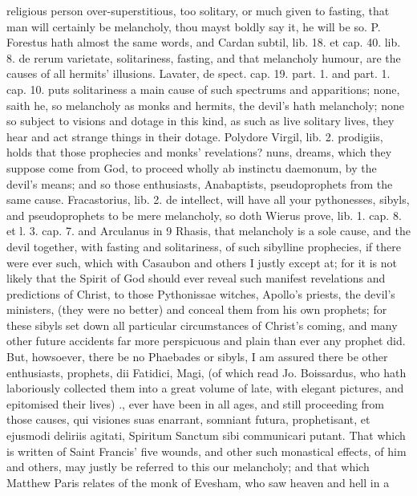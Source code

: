 {religious person over-superstitious, too solitary, or much given to
fasting, that man will certainly be melancholy, thou mayst boldly say
it, he will be so. P. Forestus hath almost the same words, and
Cardan subtil, lib. 18. et cap. 40. lib. 8. de rerum varietate,
solitariness, fasting, and that melancholy humour, are the causes of
all hermits' illusions. Lavater, de spect. cap. 19. part. 1. and part.
1. cap. 10. puts solitariness a main cause of such spectrums and
apparitions; none, saith he, so melancholy as monks and hermits, the
devil's hath melancholy; none so subject to visions and dotage in
this kind, as such as live solitary lives, they hear and act strange
things in their dotage. Polydore Virgil, lib. 2. prodigiis, holds
that those prophecies and monks' revelations? nuns, dreams, which they
suppose come from God, to proceed wholly ab instinctu daemonum, by the
devil's means; and so those enthusiasts, Anabaptists, pseudoprophets
from the same cause. Fracastorius, lib. 2. de intellect, will
have all your pythonesses, sibyls, and pseudoprophets to be mere
melancholy, so doth Wierus prove, lib. 1. cap. 8. et l. 3. cap. 7. and
Arculanus in 9 Rhasis, that melancholy is a sole cause, and the devil
together, with fasting and solitariness, of such sibylline prophecies,
if there were ever such, which with Casaubon and others I justly
except at; for it is not likely that the Spirit of God should ever
reveal such manifest revelations and predictions of Christ, to those
Pythonissae witches, Apollo's priests, the devil's ministers, (they
were no better) and conceal them from his own prophets; for these
sibyls set down all particular circumstances of Christ's coming, and
many other future accidents far more perspicuous and plain than ever
any prophet did. But, howsoever, there be no Phaebades or sibyls, I am
assured there be other enthusiasts, prophets, dii Fatidici, Magi, (of
which read Jo. Boissardus, who hath laboriously collected them into a
great volume of late, with elegant pictures, and epitomised their
lives) \etc{}., ever have been in all ages, and still proceeding from those
causes, qui visiones suas enarrant, somniant futura,
prophetisant, et ejusmodi deliriis agitati, Spiritum Sanctum sibi
communicari putant. That which is written of Saint Francis' five
wounds, and other such monastical effects, of him and others, may
justly be referred to this our melancholy; and that which Matthew Paris
relates of the monk of Evesham, who saw heaven and hell in a
}
